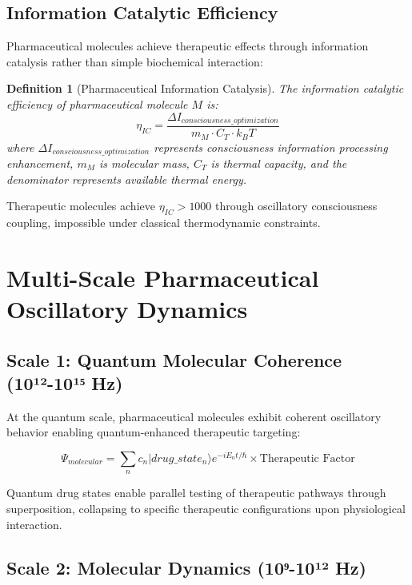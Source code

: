 \documentclass[12pt,a4paper]{article}
\newtheorem{definition}{Definition}
\begin{document}
\subsection{Information Catalytic Efficiency}

Pharmaceutical molecules achieve therapeutic effects through information catalysis rather than simple biochemical interaction:

\begin{definition}[Pharmaceutical Information Catalysis]
The information catalytic efficiency of pharmaceutical molecule $M$ is:
\begin{equation}
\eta_{IC} = \frac{\Delta I_{consciousness\_optimization}}{m_M \cdot C_T \cdot k_B T}
\end{equation}
where $\Delta I_{consciousness\_optimization}$ represents consciousness information processing enhancement, $m_M$ is molecular mass, $C_T$ is thermal capacity, and the denominator represents available thermal energy.
\end{definition}

Therapeutic molecules achieve $\eta_{IC} > 1000$ through oscillatory consciousness coupling, impossible under classical thermodynamic constraints.

\section{Multi-Scale Pharmaceutical Oscillatory Dynamics}

\subsection{Scale 1: Quantum Molecular Coherence (10¹²-10¹⁵ Hz)}

At the quantum scale, pharmaceutical molecules exhibit coherent oscillatory behavior enabling quantum-enhanced therapeutic targeting:

\begin{equation}
\Psi_{molecular} = \sum_n c_n |drug\_state_n\rangle e^{-iE_n t/\hbar} \times \text{Therapeutic Factor}
\end{equation}

Quantum drug states enable parallel testing of therapeutic pathways through superposition, collapsing to specific therapeutic configurations upon physiological interaction.

\subsection{Scale 2: Molecular Dynamics (10⁹-10¹² Hz)}
\end{document}
